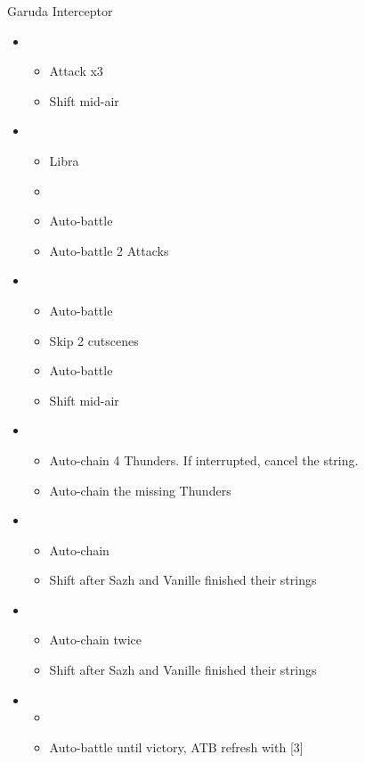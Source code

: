 	\begin{battle}[1:19]{Garuda Interceptor}
		\begin{itemize}
			\item \first
			      \begin{itemize}
				      \item Attack x3
				      \item Shift mid-air
			      \end{itemize}
			\item \third
			      \begin{itemize}
				      \item Libra
				      \item \stagger
				      \item Auto-battle
				      \item Auto-battle 2 Attacks
			      \end{itemize}
			\item \first
			      \begin{itemize}
				      \item Auto-battle
				      \item Skip 2 cutscenes
				      \item Auto-battle
				      \item Shift mid-air
			      \end{itemize}
			\item \second
			      \begin{itemize}
				      \item Auto-chain 4 Thunders. If interrupted, cancel the string.
                      \item Auto-chain the missing Thunders
			      \end{itemize}
			\item \fourth
			      \begin{itemize}
				      \item Auto-chain
				      \item Shift after Sazh and Vanille finished their strings
			      \end{itemize}
			\item \second
			      \begin{itemize}
				      \item Auto-chain twice
				      \item Shift after Sazh and Vanille finished their strings
			      \end{itemize}
			\item \first
			      \begin{itemize}
				      \item \stagger
				      \item Auto-battle until victory, ATB refresh with [3]
			      \end{itemize}
		\end{itemize}
	\end{battle}

